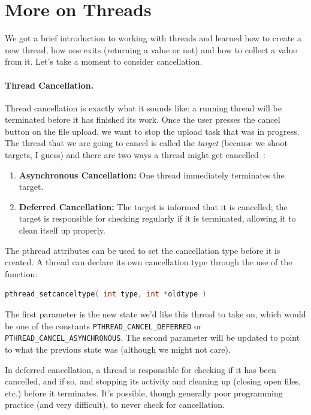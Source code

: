 




\section*{More on Threads}

We got a brief introduction to working with threads and learned how to create a new thread, how one exits (returning a value or not) and how to collect a value from it. Let's take a moment to consider cancellation.

\paragraph{Thread Cancellation.}
Thread cancellation is exactly what it sounds like: a running thread will be terminated before it has finished its work. Once the user presses the cancel button on the file upload, we want to stop the upload task that was in progress. The thread that we are going to cancel is called the \textit{target} (because we shoot targets, I guess) and there are two ways a thread might get cancelled~\cite{osc}:

\begin{enumerate}
	\item \textbf{Asynchronous Cancellation:} One thread immediately terminates the target.
	\item \textbf{Deferred Cancellation:} The target is informed that it is cancelled; the target is responsible for checking regularly if it is terminated, allowing it to clean itself up properly.
\end{enumerate}

The pthread attributes can be used to set the cancellation type before it is created. A thread can declare its own cancellation type through the use of the function:
\begin{lstlisting}[language=C]
pthread_setcanceltype( int type, int *oldtype )
\end{lstlisting}

The first parameter is the new state we'd like this thread to take on, which would be one of the constants \texttt{PTHREAD\_CANCEL\_DEFERRED} or \texttt{PTHREAD\_CANCEL\_ASYNCHRONOUS}. The second parameter will be updated to point to what the previous state was (although we might not care).

In deferred cancellation, a thread is responsible for checking if it has been cancelled, and if so, and stopping its activity and cleaning up (closing open files, etc.) before it terminates. It's possible, though generally poor programming practice (and very difficult), to never check for cancellation.

